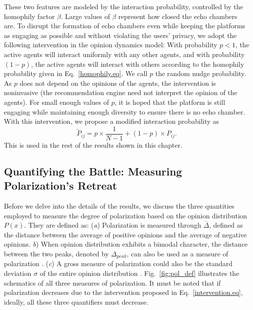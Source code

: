 These two features are modeled by the interaction probability, controlled by the homophily factor $\beta$. Large values of $\beta$ represent how closed the echo chambers are. To disrupt the formation of echo chambers even while keeping the platforms as engaging as possible and without violating the users' privacy, we adopt the following intervention in the opinion dynamics model:
With probability $p<1$, the active agents will interact uniformly with any other agents, and with probability $(1 - p)$, the active agents will interact with others according to the homophily probability given in Eq.~\eqref{homophily.eq}. We call $p$ the random nudge probability. As $p$ does not depend on the opinions of the agents, the intervention is noninvasive (the recommendation engine need not interpret the opinion of the agents). For small enough values of $p$, it is hoped that the platform is still engaging while maintaining enough diversity to ensure there is no echo chamber. With this intervention, we propose a modified interaction probability as 
\begin{equation}
    \label{intervention.eq}
    \widetilde P_{ij} = p \times \frac{1}{N - 1} + (1 - p) \times P_{ij}.
\end{equation}
This is used in the rest of the results shown in this chapter.

\subsection{Quantifying the Battle: Measuring Polarization's Retreat}

Before we delve into the details of the results, we discuss the three quantities employed to measure the degree of polarization based on the opinion distribution $P(x)$. They are defined as: ({\it a}) Polarization is measured through $\bar \Delta$, defined as the distance between the average of positive opinions and the average of negative opinions. {\it b}) When opinion distribution exhibits a bimodal character, the distance between the two peaks, denoted by $\Delta_{peak}$, can also be used as a measure of polarization \cite{depolarization-of-echo-chambers-by-random-dynamical-nudge}.
({\it c}) A gross measure of polarization could also be the standard deviation $\sigma$ of the entire opinion distribution \cite{link-recommendation-algorithms-and-dynamics-of-polarization-in-social-networks}. Fig.~\ref{fig:pol_def} illustrates the schematics of all three measures of polarization. It must be noted that if polarization decreases due to the intervention proposed in Eq.~\eqref{intervention.eq}, ideally, all these three quantifiers must decrease.


